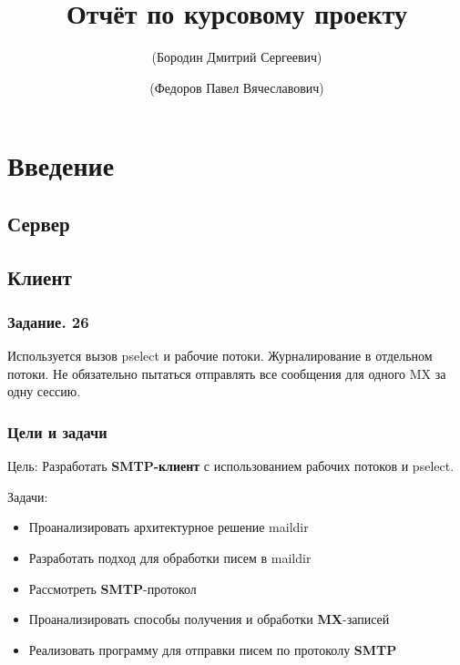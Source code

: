 \documentclass[a4paper,12pt]{report}
\title{Отчёт по курсовому проекту}
\author{(Бородин Дмитрий Сергеевич)}
\author{(Федоров Павел Вячеславович)}
\begin{document}
\maketitle

\tableofcontents

\chapter*{Введение}

\section*{Сервер}

\section*{Клиент}

\subsection*{Задание. 26}
Используется вызов pselect и рабочие потоки. Журналирование в отдельном потоки. Не обязательно пытаться отправлять все сообщения для одного MX за одну сессию.
\subsection*{Цели и задачи}
Цель: 
    Разработать \textbf{SMTP-клиент} с использованием рабочих потоков и pselect.

Задачи:
\begin{itemize}
    \item Проанализировать архитектурное решение maildir
    \item Разработать подход для обработки писем в maildir 
    \item Рассмотреть \textbf{SMTP}-протокол
    \item Проанализировать способы получения и обработки \textbf{MX}-записей
    \item Реализовать программу для отправки писем по протоколу \textbf{SMTP}
\end{itemize}





\end{document}
